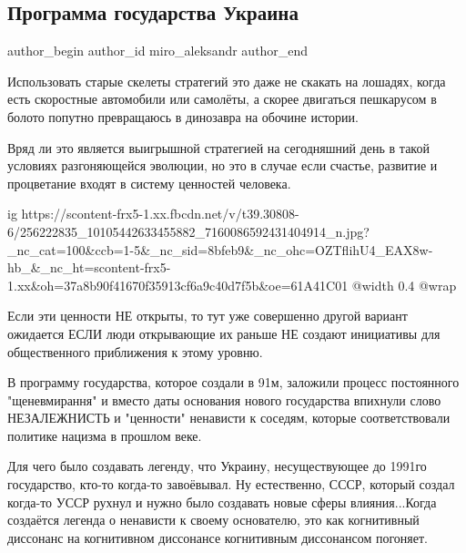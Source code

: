  
 
 
 
 
 
\subsection{Программа государства Украина}
\label{sec:22_11_2021.fb.miro_aleksandr.1.programma_gosudarstvo}
 
\ifcmt
 author_begin
   author_id miro_aleksandr
 author_end
\fi

Использовать старые скелеты стратегий это даже не скакать на лошадях, когда
есть скоростные автомобили или самолёты, а скорее двигаться пешкарусом в болото
попутно превращаюсь в динозавра на обочине истории.

Вряд ли это является выигрышной стратегией на сегодняшний день в такой условиях
разгоняющейся эволюции, но это в случае если счастье, развитие и процветание
входят в систему ценностей человека. 

\ifcmt
  ig https://scontent-frx5-1.xx.fbcdn.net/v/t39.30808-6/256222835_10105442633455882_7160086592431404914_n.jpg?_nc_cat=100&ccb=1-5&_nc_sid=8bfeb9&_nc_ohc=OZTflihU4_EAX8w-hb_&_nc_ht=scontent-frx5-1.xx&oh=37a8b90f41670f35913cf6a9c40d7f5b&oe=61A41C01
  @width 0.4
  @wrap 
\fi

Если эти ценности НЕ открыты, то тут уже совершенно другой вариант ожидается
ЕСЛИ люди открывающие их раньше НЕ создают инициативы для общественного
приближения к этому уровню.

В программу государства, которое создали в 91м, заложили процесс постоянного
"щеневмирання" и вместо даты основания нового государства впихнули слово
НЕЗАЛЕЖНИСТЬ и "ценности" ненависти к соседям, которые соответствовали политике
нацизма в прошлом веке.

Для чего было создавать легенду, что Украину, несуществующее до 1991го
государство, кто-то когда-то завоёвывал. Ну естественно, СССР, который создал
когда-то УССР рухнул и нужно было создавать новые сферы влияния...Когда
создаётся легенда о ненависти к своему основателю, это как когнитивный
диссонанс на когнитивном диссонансе когнитивным диссонансом погоняет.

